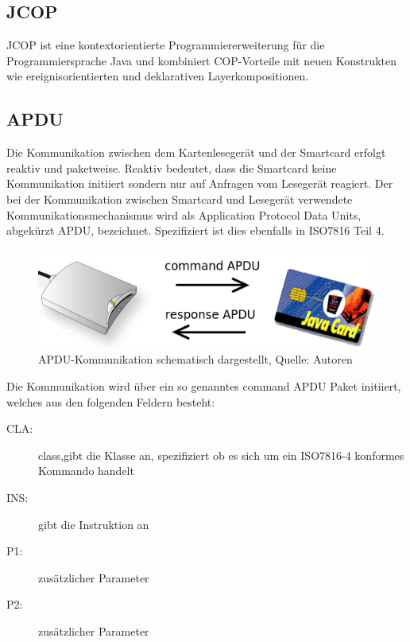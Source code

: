 \documentclass[a4paper,12pt]{scrartcl}
\begin{document}
\subsection{JCOP}
\label{subsec:2.2}
JCOP ist eine kontextorientierte Programmiererweiterung für die Programmiersprache Java und kombiniert COP-Vorteile mit neuen Konstrukten wie ereignisorientierten und deklarativen Layerkompositionen.

\subsection{APDU}
\label{subsec:2.3}

Die Kommunikation zwischen dem Kartenlesegerät und der Smartcard erfolgt reaktiv und paketweise. Reaktiv bedeutet, dass die Smartcard keine Kommunikation initiiert sondern nur auf Anfragen vom Lesegerät reagiert. Der bei der Kommunikation zwischen Smartcard und Lesegerät verwendete Kommunikationsmechanismus wird als Application Protocol Data Units, abgekürzt APDU, bezeichnet. Spezifiziert ist dies ebenfalls in ISO7816 Teil 4.\cite{iso7816}
\\

\begin{figure}[htb]
\begin{center}
 \includegraphics[width=1\hsize]{./images/apdu.png}
\end{center}
\caption[APDU-Kommunikation schematisch dargestellt, Quelle: Autoren]{\label{apdu}APDU-Kommunikation schematisch dargestellt, Quelle: Autoren}
\end{figure}

Die Kommunikation wird über ein so genanntes command APDU Paket initiiert, welches aus den folgenden Feldern besteht:


\begin{description}
\item[CLA:] class,gibt die Klasse an, spezifiziert ob es sich um ein ISO7816-4 konformes Kommando handelt
\item[INS:] gibt die Instruktion an
\item[P1:] zusätzlicher Parameter
\item[P2:] zusätzlicher Parameter
\end{description} 
\end{document}
